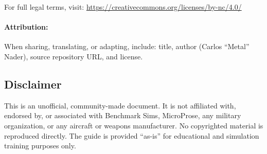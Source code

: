 \documentclass[11pt, a4paper, twoside]{report}
\begin{document}
For full legal terms, visit: \url{https://creativecommons.org/licenses/by-nc/4.0/}

\paragraph{Attribution:}
When sharing, translating, or adapting, include: title, author (Carlos ``Metal'' Nader), source repository URL, and license.

\subsection{Disclaimer}
\label{sec:C1-S4-S5}

This is an unofficial, community-made document. It is not affiliated with, endorsed by, or associated with Benchmark Sims, MicroProse, any military organization, or any aircraft or weapons manufacturer. No copyrighted material is reproduced directly. The guide is provided ``as-is'' for educational and simulation training purposes only.

\newpage
\end{document}
